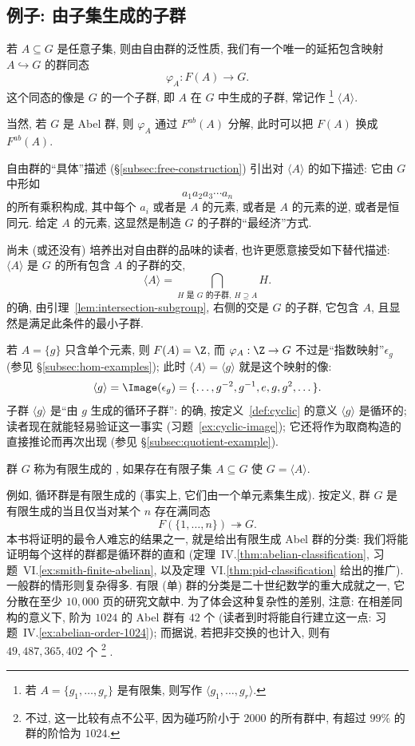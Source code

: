 \subsection{例子: 由子集生成的子群}
\label{subsec:subgroups-generated}

若 $A \subseteq G$ 是任意子集, 则由自由群的泛性质, 我们有一个唯一的延拓包含映射 $A\hookrightarrow G$ 的群同态
\[
\varphi_A : F(A) \to G.
\]
这个同态的像是 $G$ 的一个子群, 即 $A$ 在 $G$ 中生成的子群, 常记作%
\footnote{若 $A = \{g_1, \ldots, g_r\}$ 是有限集, 则写作 $\langle g_1, \ldots, g_r \rangle$.}%
$\langle A \rangle$.

当然, 若 $G$ 是 Abel 群, 则 $\varphi_A$ 通过 $F^{ab}(A)$ 分解, 此时可以把 $F(A)$ 换成 $F^{ab}(A)$.

自由群的``具体''描述 (\S\ref{subsec:free-construction}) 引出对 $\langle A \rangle$ 的如下描述: 它由 $G$ 中形如
\[
a_1 a_2 a_3 \cdots a_n
\]
的所有乘积构成, 其中每个 $a_i$ 或者是 $A$ 的元素, 或者是 $A$ 的元素的逆, 或者是恒同元. 给定 $A$ 的元素, 这显然是制造 $G$ 的子群的``最经济''方式.

尚未 (或还没有) 培养出对自由群的品味的读者, 也许更愿意接受如下替代描述: $\langle A \rangle$ 是 $G$ 的所有包含 $A$ 的子群的交,
\[
\langle A \rangle = \bigcap_{H \text{ 是 } G \text{ 的子群},\ H \supseteq A} H.
\]
的确, 由引理~\ref{lem:intersection-subgroup}, 右侧的交是 $G$ 的子群, 它包含 $A$, 且显然是满足此条件的最小子群.

若 $A = \{g\}$ 只含单个元素, 则 $F(A) = \Z$, 而 $\varphi_A : \Z \to G$ 不过是``指数映射''$\epsilon_g$ (参见 \S\ref{subsec:hom-examples}); 此时 $\langle A \rangle = \langle g \rangle$ 就是这个映射的像:
\[
\langle g \rangle = \Image(\epsilon_g) = \{\dots, g^{-2}, g^{-1}, e, g, g^2, \dots\}.
\]
子群 $\langle g \rangle$ 是``由 $g$ 生成的循环子群'': 的确, 按定义~\ref{def:cyclic} 的意义 $\langle g \rangle$ 是循环的; 读者现在就能轻易验证这一事实 (习题~\ref{ex:cyclic-image}); 它还将作为取商构造的直接推论而再次出现 (参见 \S\ref{subsec:quotient-example}).

\begin{definition}
\label{def:finitely-generated}
群 $G$ 称为有限生成的%
, 如果存在有限子集 $A \subseteq G$ 使 $G = \langle A \rangle$.
\end{definition}

例如, 循环群是有限生成的 (事实上, 它们由一个单元素集生成). 按定义, 群 $G$ 是有限生成的当且仅当对某个 $n$ 存在满同态
\[
F(\{1, \ldots, n\}) \twoheadrightarrow G.
\]
本书将证明的最令人难忘的结果之一, 就是给出有限生成 Abel 群的分类: 我们将能证明每个这样的群都是循环群的直和 (定理~IV.\ref{thm:abelian-classification}, 习题~VI.\ref{ex:smith-finite-abelian}, 以及定理~VI.\ref{thm:pid-classification} 给出的推广). 一般群的情形则复杂得多. 有限 (单) 群的分类是二十世纪数学的重大成就之一, 它分散在至少 $10{,}000$ 页的研究文献中. 为了体会这种复杂性的差别, 注意: 在相差同构的意义下, 阶为 $1024$ 的 Abel 群有 $42$ 个 (读者到时将能自行建立这一点: 习题~IV.\ref{ex:abelian-order-1024}); 而据说, 若把非交换的也计入, 则有 $49{,}487{,}365{,}402$ 个%
\footnote{不过, 这一比较有点不公平, 因为碰巧阶小于 $2000$ 的所有群中, 有超过 $99\%$ 的群的阶恰为 $1024$.}%
.

